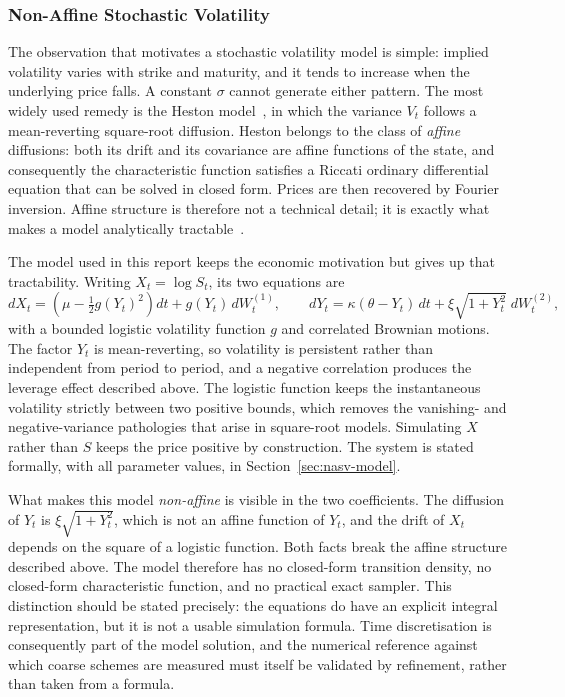 \documentclass[11pt,a4paper]{article}
\theoremstyle{definition}
\theoremstyle{remark}
\begin{document}
\subsubsection{Non-Affine Stochastic Volatility}
\label{sec:non-affine}

The observation that motivates a stochastic volatility model is simple:
implied volatility varies with strike and maturity, and it tends to increase
when the underlying price falls. A constant $\sigma$ cannot generate either
pattern. The most widely used remedy is the Heston model~\cite{heston}, in
which the variance $V_t$ follows a mean-reverting square-root diffusion.
Heston belongs to the class of \emph{affine} diffusions: both its drift and its
covariance are affine functions of the state, and consequently the
characteristic function satisfies a Riccati ordinary differential equation that
can be solved in closed form. Prices are then recovered by Fourier inversion.
Affine structure is therefore not a technical detail; it is exactly what makes
a model analytically tractable~\cite{dfs}.

The model used in this report keeps the economic motivation but gives up that
tractability. Writing $X_t = \log S_t$, its two equations are
\[
    dX_t = \left( \mu - \tfrac12 g(Y_t)^2 \right) dt + g(Y_t)\, dW_t^{(1)},
    \qquad
    dY_t = \kappa (\theta - Y_t)\, dt + \xi \sqrt{1 + Y_t^{2}}\; dW_t^{(2)},
\]
with a bounded logistic volatility function $g$ and correlated Brownian
motions. The factor $Y_t$ is mean-reverting, so volatility is persistent rather
than independent from period to period, and a negative correlation produces the
leverage effect described above. The logistic function keeps the instantaneous
volatility strictly between two positive bounds, which removes the
vanishing- and negative-variance pathologies that arise in square-root models.
Simulating $X$ rather than $S$ keeps the price positive by construction. The
system is stated formally, with all parameter values, in
Section~\ref{sec:nasv-model}.

What makes this model \emph{non-affine} is visible in the two coefficients. The
diffusion of $Y_t$ is $\xi\sqrt{1 + Y_t^{2}}$, which is not an affine function
of $Y_t$, and the drift of $X_t$ depends on the square of a logistic function.
Both facts break the affine structure described above. The model therefore has
no closed-form transition density, no closed-form characteristic function, and
no practical exact sampler. This distinction should be stated precisely: the
equations do have an explicit integral representation, but it is not a usable
simulation formula. Time discretisation is consequently part of the model
solution, and the numerical reference against which coarse schemes are measured
must itself be validated by refinement, rather than taken from a formula.
\end{document}
